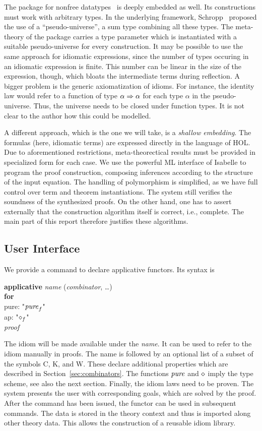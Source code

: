 The package for nonfree datatypes~\cite{schropp13} is deeply embedded as well.
Its constructions must work with arbitrary types.
In the underlying framework, Schropp~\cite{schropp12} proposed the use of a
``pseudo-universe'', a sum type combining all these types.
The meta-theory of the package carries a type parameter which is instantiated
with a suitable pseudo-universe for every construction.
It may be possible to use the same approach for idiomatic expressions, since the
number of types occuring in an idiomatic expression is finite.
This number can be linear in the size of the expression, though, which bloats
the intermediate terms during reflection.
A bigger problem is the generic axiomatization of idioms.
For instance, the identity law would refer to a function of type $\alpha \Rightarrow \alpha$
for each type $\alpha$ in the pseudo-universe.
Thus, the universe needs to be closed under function types.
It is not clear to the author how this could be modelled.

A different approach, which is the one we will take, is a \emph{shallow embedding}.
The formulas (here, idiomatic terms) are expressed directly in the language of HOL.
Due to aforementioned restrictions, meta-theorectical results must be provided
in specialized form for each case.
We use the powerful ML interface of Isabelle to program the proof construction,
composing inferences according to the structure of the input equation.
The handling of polymorphism is simplified, as we have full control over
term and theorem instantiations.
The system still verifies the soundness of the synthesized proofs.
On the other hand, one has to assert externally that the construction algorithm
itself is correct, i.e., complete.
The main part of this report therefore justifies these algorithms.


\subsection{User Interface}\label{subsec:interface}

We provide a command to declare applicative functors.
Its syntax is
\begin{isabelle}
	\textbf{applicative} \textit{name} (\textit{combinator}, \dots) \\
	\textbf{for} \\
	\iindent pure: "$\operatorname{\mathit{pure}}_f$" \\
	\iindent ap: "$\diamond_f$" \\
	\textit{proof}
\end{isabelle}
The idiom will be made available under the \textit{name}.
It can be used to refer to the idiom manually in proofs.
The name is followed by an optional list of a subset of the symbols C, K, and W.
These declare additional properties which are described in Section~\ref{sec:combinators}.
The functions $\operatorname{\mathit{pure}}$ and $\diamond$ imply the type scheme, see also the next
section.
Finally, the idiom laws need to be proven.
The system presents the user with corresponding goals, which are solved by the
proof.
After the command has been issued, the functor can be used in subsequent
commands.
The data is stored in the theory context and thus is imported along other
theory data.
This allows the construction of a reusable idiom library.

